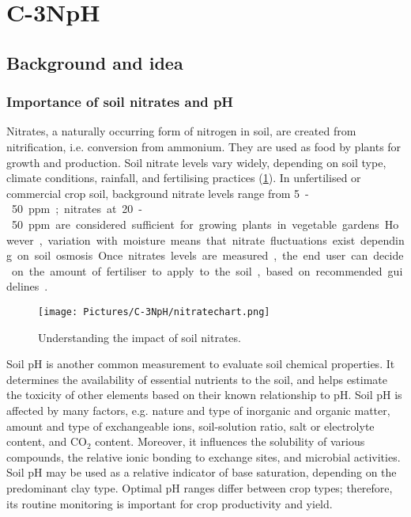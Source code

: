\section{C-3NpH}
\subsection{Background and idea}
\subsubsection{Importance of soil nitrates and pH}
Nitrates, a naturally occurring form of nitrogen in soil, are created from nitrification, i.e. conversion from ammonium. They are used as food by plants for growth and production. Soil nitrate levels vary widely, depending on soil type, climate conditions, rainfall, and fertilising practices (\cref{fig:soilnitrates}). In unfertilised or commercial crop soil, background nitrate levels range from \SI{5}-\SI{50}{ppm}; nitrates at \SI{20}-\SI{50}{ppm} are considered sufficient for growing plants in vegetable gardens. However, variation with moisture means that nitrate fluctuations exist depending on soil osmosis. Once nitrates levels are measured, the end user can decide on the amount of fertiliser to apply to the soil, based on recommended guidelines \cite{laqua}.



\begin{figure}[h!]
	\centering
	\texttt{[image: Pictures/C-3NpH/nitratechart.png]}
	\captionsetup{justification = centering}
	\caption{Understanding the impact of soil nitrates.}
	\label{fig:soilnitrates}
\end{figure}

Soil pH is another common measurement to evaluate soil chemical properties. It determines the availability of essential nutrients to the soil, and helps estimate the toxicity of other elements based on their known relationship to pH. Soil pH is affected by many factors, e.g. nature and type of inorganic and organic matter, amount and type of exchangeable ions, soil-solution ratio, salt or electrolyte content, and CO$_2$ content. Moreover, it influences the solubility of various compounds, the relative ionic bonding to exchange sites, and microbial activities. Soil pH may be used as a relative indicator of base saturation, depending on the predominant clay type. Optimal pH ranges differ between crop types; therefore, its routine monitoring is important for crop productivity and yield\cite{soilph}.

